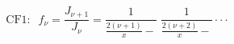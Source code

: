 \documentclass[12pt]{article}
\begin{document}
\begin{displaymath}
\textrm{CF1}:\;\;
f_\nu = \frac{J_{\nu+1}}{J_\nu}
      = \frac{1}{\frac{2(\nu+1)}{x}-} \; \frac{1}{\frac{2(\nu+2)}{x}-} \cdot\cdot\cdot
\end{displaymath}
\end{document}
